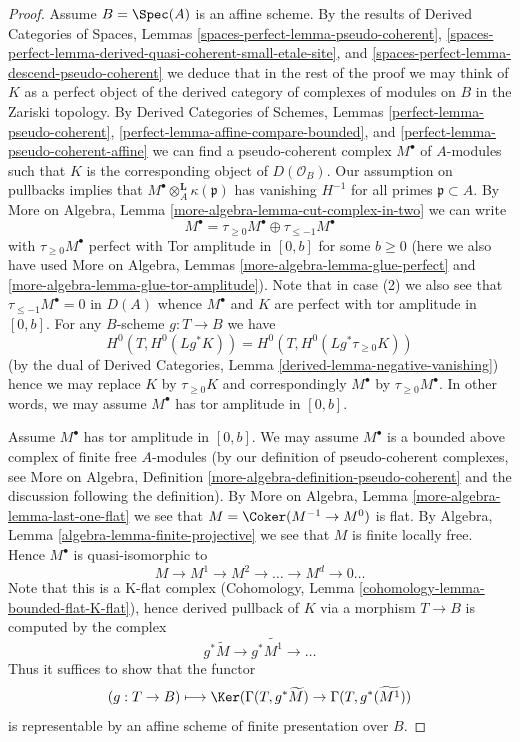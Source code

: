 \begin{proof}
\medskip\noindent
Assume $B = \Spec(A)$ is an affine scheme. By the results of
Derived Categories of Spaces, Lemmas
\ref{spaces-perfect-lemma-pseudo-coherent},
\ref{spaces-perfect-lemma-derived-quasi-coherent-small-etale-site}, and
\ref{spaces-perfect-lemma-descend-pseudo-coherent}
we deduce that in the rest of the proof we may think of $K$ as a perfect
object of the derived category of complexes of modules on $B$
in the Zariski topology. By
Derived Categories of Schemes, Lemmas
\ref{perfect-lemma-pseudo-coherent},
\ref{perfect-lemma-affine-compare-bounded}, and
\ref{perfect-lemma-pseudo-coherent-affine} we can find a pseudo-coherent
complex $M^\bullet$ of $A$-modules such that $K$ is the corresponding
object of $D(\mathcal{O}_B)$. Our assumption on pullbacks implies
that $M^\bullet \otimes^\mathbf{L}_A \kappa(\mathfrak p)$
has vanishing $H^{-1}$ for all primes $\mathfrak p \subset A$.
By More on Algebra, Lemma \ref{more-algebra-lemma-cut-complex-in-two}
we can write
$$
M^\bullet =
\tau_{\geq 0}M^\bullet \oplus \tau_{\leq - 1}M^\bullet
$$
with $\tau_{\geq 0}M^\bullet$ perfect with Tor amplitude in $[0, b]$
for some $b \geq 0$ (here we also have used
More on Algebra, Lemmas \ref{more-algebra-lemma-glue-perfect} and
\ref{more-algebra-lemma-glue-tor-amplitude}).
Note that in case (2) we also see that $\tau_{\leq - 1}M^\bullet = 0$
in $D(A)$ whence $M^\bullet$ and $K$ are perfect with
tor amplitude in $[0, b]$. For any $B$-scheme $g : T \to B$ we have
$$
H^0(T, H^0(Lg^*K)) = H^0(T, H^0(Lg^*\tau_{\geq 0}K))
$$
(by the dual of Derived Categories, Lemma
\ref{derived-lemma-negative-vanishing})
hence we may replace $K$ by $\tau_{\geq 0}K$ and correspondingly
$M^\bullet$ by $\tau_{\geq 0}M^\bullet$. In other words, we may
assume $M^\bullet$ has tor amplitude in $[0, b]$.

\medskip\noindent
Assume $M^\bullet$ has tor amplitude in $[0, b]$.
We may assume $M^\bullet$ is a bounded above complex of finite free
$A$-modules (by our definition of pseudo-coherent complexes, see
More on Algebra, Definition \ref{more-algebra-definition-pseudo-coherent}
and the discussion following the definition).
By More on Algebra, Lemma \ref{more-algebra-lemma-last-one-flat}
we see that $M = \Coker(M^{- 1} \to M^0)$ is flat. By
Algebra, Lemma \ref{algebra-lemma-finite-projective} we see that $M$
is finite locally free. Hence $M^\bullet$ is quasi-isomorphic to
$$
M \to M^1 \to M^2 \to \ldots \to M^d \to 0 \ldots
$$
Note that this is a K-flat complex
(Cohomology, Lemma \ref{cohomology-lemma-bounded-flat-K-flat}),
hence derived pullback of $K$ via a morphism $T \to B$ is computed
by the complex
$$
g^*\widetilde{M} \to g^*\widetilde{M^1} \to \ldots
$$
Thus it suffices to show that the functor
$$
(g : T \to B) \longmapsto
\Ker(
\Gamma(T,g^*\widetilde{M})
\to
\Gamma(T, g^*(\widetilde{M^1})
)
$$
is representable by an affine scheme of finite presentation over $B$.


\end{proof}
